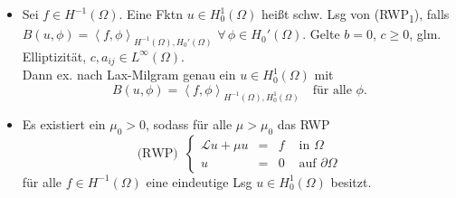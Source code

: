 \documentclass{cheat-sheet}
\newcommand{\bOmega}{\partial \Omega} %
\newcommand{\LL}{\mathcal{L}} %
\newcommand{\tss}[1]{\textsubscript{#1}} %
\newcommand{\scp}[2]{\left\langle #1 , #2 \right\rangle} %
\begin{document}
\begin{bemn}
  \begin{itemize}
    \item Sei $f \in H^{-1}(\Omega)$.
    Eine Fktn $u \in H_0^1(\Omega)$ heißt schw. Lsg von (RWP\tss{1}), falls $B(u, \phi) = \scp{f}{\phi}_{H^{-1}(\Omega), H_0'(\Omega)}$ $\forall \, \phi \in H_0'(\Omega)$.
    Gelte $b = 0$, $c \geq 0$, glm. Elliptizität, $c, a_{ij} \in L^\infty(\Omega)$. \\
    Dann ex. nach Lax-Milgram genau ein $u \in H_0^1(\Omega)$ mit \[
      B(u, \phi) = \scp{f}{\phi}_{H^{-1}(\Omega), H_0^1(\Omega)} \quad
      \text{für alle $\phi$.}
    \]
    \item Es existiert ein $\mu_0 > 0$, sodass für alle $\mu > \mu_0$ das RWP
    \[
      \text{(RWP)} \enspace \left\{ \begin{array}{rlll}
        \LL u + \mu u &=& f &\text{ in $\Omega$} \\
        u &=& 0 &\text{ auf $\bOmega$}
      \end{array} \right.
    \]
    für alle $f \in H^{-1}(\Omega)$ eine eindeutige Lsg $u \in H_0^1(\Omega)$ besitzt.
  \end{itemize}
\end{bemn}



\end{document}
